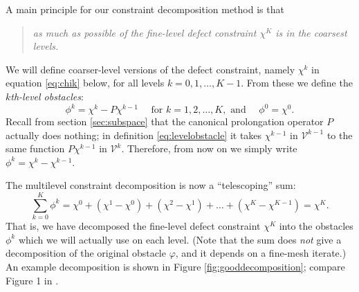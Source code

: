 \documentclass[letterpaper,final,12pt,reqno]{amsart}
\numberwithin{equation}{section}
\numberwithin{figure}{section}
\numberwithin{table}{section}
\begin{document}
A main principle for our constraint decomposition method is that
\begin{quote}
\emph{as much as possible of the fine-level defect constraint $\chi^K$ is in the coarsest levels.}
\end{quote}
We will define coarser-level versions of the defect constraint, namely $\chi^k$ in equation \eqref{eq:chik} below, for all levels $k=0,1,\dots,K-1$.  From these we define the \emph{$k$th-level obstacles}:
\begin{equation}
  \phi^k = \chi^k - P\chi^{k-1} \quad \text{ for } k=1,2,\dots,K, \text{ and } \quad \phi^0 = \chi^0.  \label{eq:levelobstacle}
\end{equation}
Recall from section \ref{sec:subspace} that the canonical prolongation operator $P$ actually does nothing; in definition \eqref{eq:levelobstacle} it takes $\chi^{k-1}$ in $\mathcal{V}^{k-1}$ to the same function $P\chi^{k-1}$ in $\mathcal{V}^k$.  Therefore, from now on we simply write $\phi^k = \chi^k - \chi^{k-1}$.

The multilevel constraint decomposition is now a ``telescoping'' sum:
\begin{equation}
  \sum_{k=0}^K \phi^k = \chi^0 + (\chi^1 - \chi^0) + (\chi^2 - \chi^1) + \dots + (\chi^K - \chi^{K-1}) = \chi^K.  \label{eq:telescopingdecomposition}
\end{equation}
That is, we have decomposed the fine-level defect constraint $\chi^K$ into the obstacles $\phi^k$ which we will actually use on each level.  (Note that the sum does \emph{not} give a decomposition of the original obstacle $\varphi$, and it depends on a fine-mesh iterate.)  An example decomposition is shown in Figure \ref{fig:gooddecomposition}; compare Figure 1 in \cite{GraeserKornhuber2009}.
\end{document}

